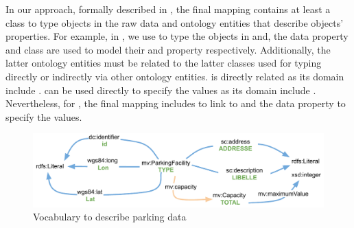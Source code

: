 In our approach, formally described in , the final mapping contains at least a class to type objects in the raw data and ontology entities that describe  objects' properties. For example, in , we use  to type the objects in  and, the data property  and class  are used to model their  and  property respectively. Additionally, the latter ontology entities must be related to the latter classes used for typing directly or indirectly via other ontology entities.  is directly related as its domain include .  can be used directly to specify the values as its domain include . Nevertheless, for , the final mapping includes  to link to  and the data property  to specify the values.  

\begin{figure}[h]
	\centering
	\includegraphics[scale=0.5]{images/sampleOntologyRawData.pdf}
	\caption{Vocabulary to describe parking data}
	\label{fig:sampleOntologyRawData}
\end{figure}

